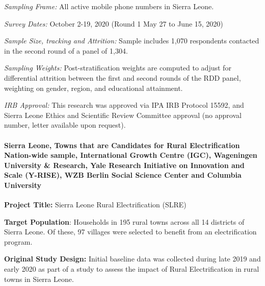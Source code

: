 \documentclass[
  12pt,
]{article}
\begin{document}
\emph{Sampling Frame:} All active mobile phone numbers in Sierra Leone.

\emph{Survey Dates:} October 2-19, 2020 (Round 1 May 27 to June 15, 2020)

\emph{Sample Size, tracking and Attrition:} Sample includes 1,070 respondents contacted in the second round of a panel of 1,304.

\emph{Sampling Weights:} Post-stratification weights are computed to adjust for differential attrition between the first and second rounds of the RDD panel, weighting on gender, region, and educational attainment.

\emph{IRB Approval:} This research was approved via IPA IRB Protocol 15592, and Sierra Leone Ethics and Scientific Review Committee approval (no approval number, letter available upon request).

\hypertarget{sierra-leone-towns-that-are-candidates-for-rural-electrification-nation-wide-sample-international-growth-centre-igc-wageningen-university-research-yale-research-initiative-on-innovation-and-scale-y-rise-wzb-berlin-social-science-center-and-columbia-university}{%
\paragraph*{Sierra Leone, Towns that are Candidates for Rural Electrification Nation-wide sample, International Growth Centre (IGC), Wageningen University \& Research, Yale Research Initiative on Innovation and Scale (Y-RISE), WZB Berlin Social Science Center and Columbia University}\label{sierra-leone-towns-that-are-candidates-for-rural-electrification-nation-wide-sample-international-growth-centre-igc-wageningen-university-research-yale-research-initiative-on-innovation-and-scale-y-rise-wzb-berlin-social-science-center-and-columbia-university}}

\textbf{Project Title:} Sierra Leone Rural Electrification (SLRE)

\textbf{Target Population}: Households in 195 rural towns across all 14 districts of Sierra Leone. Of these, 97 villages were selected to benefit from an electrification program.

\textbf{Original Study Design:} Initial baseline data was collected during late 2019 and early 2020 as part of a study to assess the impact of Rural Electrification in rural towns in Sierra Leone.
\end{document}
